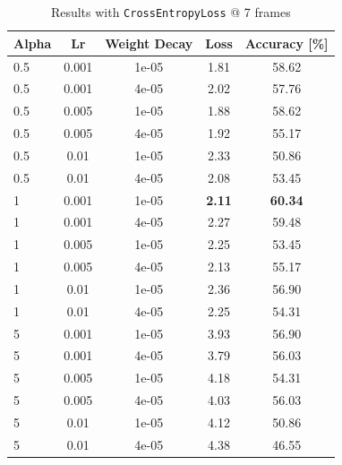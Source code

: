 \documentclass[10pt,twocolumn,letterpaper]{article}
\begin{document}
\begin{table}[h!]
	\begin{center}
		\begin{tabular}{lcc|cc}
			\textbf{Alpha} & \textbf{Lr} & \textbf{Weight Decay} & \textbf{Loss} & \textbf{Accuracy [\%]}\\
			\hline
			0.5&0.001&1e-05&1.81&58.62\\
			0.5&0.001&4e-05&2.02&57.76\\
			0.5&0.005&1e-05&1.88&58.62\\
			0.5&0.005&4e-05&1.92&55.17\\
			0.5&0.01&1e-05&2.33&50.86\\
			0.5&0.01&4e-05&2.08&53.45\\
			1&0.001&1e-05&\textbf{2.11}&\textbf{60.34}\\
			1&0.001&4e-05&2.27&59.48\\
			1&0.005&1e-05&2.25&53.45\\
			1&0.005&4e-05&2.13&55.17\\
			1&0.01&1e-05&2.36&56.90\\
			1&0.01&4e-05&2.25&54.31\\
			5&0.001&1e-05&3.93&56.90\\
			5&0.001&4e-05&3.79&56.03\\
			5&0.005&1e-05&4.18&54.31\\
			5&0.005&4e-05&4.03&56.03\\
			5&0.01&1e-05&4.12&50.86\\
			5&0.01&4e-05&4.38&46.55\\
			\hline
		\end{tabular}
	\end{center}	
	\caption{Results with \texttt{CrossEntropyLoss} @ 7 frames}
\end{table}
\end{document}
